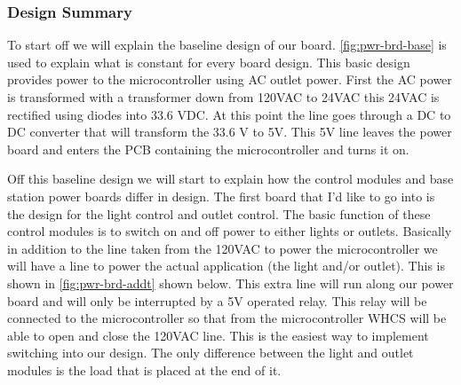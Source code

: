 \subsubsection{Design Summary}

To start off we will explain the baseline design of our board.
\autoref{fig:pwr-brd-base} is used to explain what is constant for every board design. This
basic design provides power to the microcontroller using AC outlet power. First
the AC power is transformed with a transformer down from 120VAC to 24VAC this
24VAC is rectified using diodes into 33.6 VDC. At this point the line goes
through a DC to DC converter that will transform the 33.6 V to 5V. This 5V line
leaves the power board and enters the PCB containing the microcontroller and
turns it on.


Off this baseline design we will start to explain how the
control modules and base station power boards differ in design. The first
board that I{}'d like to go into is the design for the light control and
outlet control. The basic function of these control modules is to switch on
and off power to either lights or outlets. Basically in addition to the line
taken from the 120VAC to power the microcontroller we will have a line to
power the actual application (the light and/or outlet). This is shown in
\autoref{fig:pwr-brd-addt} shown below. This extra line will run along our
power board and will only be interrupted by a 5V operated relay. This relay
will be connected to the microcontroller so that from the microcontroller
WHCS will be able to open and close the 120VAC line. This is the easiest way
to implement switching into our design. The only difference between the light
and outlet modules is the load that is placed at the end of it.


